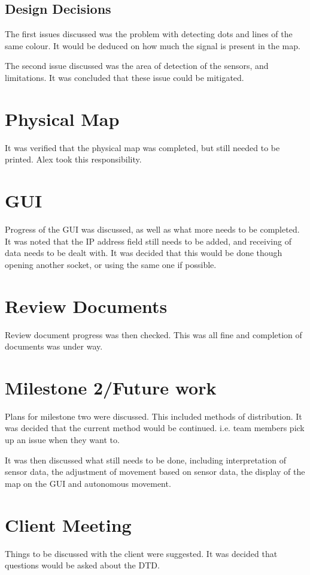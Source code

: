 \documentclass{article}
\begin{document}
\subsection{Design Decisions}
The first issues discussed was the problem with detecting dots and lines of the same colour. It would be deduced on how much the signal is present in the map. 

The second issue discussed was the area of detection of the sensors, and limitations. It was concluded that these issue could be mitigated. 

\section{Physical Map}
It was verified that the physical map was completed, but still needed to be printed. Alex took this responsibility. 

\section{GUI}
Progress of the GUI was discussed, as well as what more needs to be completed. It was noted that the IP address field still needs to be added, and receiving of data needs to be dealt with. It was decided that this would be done though opening another socket, or using the same one if possible. 

\section{Review Documents}
Review document progress was then checked. This was all fine and completion of documents was under way. 

\section{Milestone 2/Future work}
Plans for milestone two were discussed. This included methods of distribution. It was decided that the current method would be continued. i.e. team members pick up an issue when they want to. 

It was then discussed what still needs to be done, including interpretation of sensor data, the adjustment of movement based on sensor data, the display of the map on the GUI and autonomous movement. 

\section{Client Meeting}
Things to be discussed with the client were suggested. It was decided that questions would be asked about the DTD.
\end{document}
